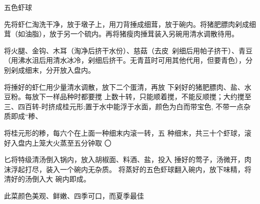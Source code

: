 \begin{recipe}{五色虾球}

\ingredients



\cooking

\step 先将虾仁淘洗干净，放于墩子上，用刀背捶成细茸，放于碗内。将猪肥膘肉剁成细茸（如油脂），放于另一个硫内。再将猪瘦肉捶茸装入另碗用清水调散待用。

\step 将火腿、金钩、木耳（淘净后挤干水份）、慈菇（去皮~剁细后用帕子挤干）、青豆（用沸水沮后用清水冰冷，剁细后挤干。无青苴时可用其他代用，但要青色），分别剁成细末，分开放入盘内。

将捶好的虾仁用少量清水调散，放下二个蛋清，再放 下剁好的猪肥膘肉、盐、水豆粉。每放下一样品种时都要搅 上数十转，只能顺着搅，不能反顺搅；大约搅至三、四百转-时挤成桂元形;置于水中能浮于水面，颜色为白而带宝色, 不带一点杂质即成“糁、

将桂元形的糁，每六个在上面一种细末内滚一转，五 种细末，共三十个虾球，滚好入盘内上笼大火蒸至五分钟取 〇

匕将特级清汤倒入锅内，放入胡椒面、料酒、盐，投入 捶好的莺子，汤微开，肉沫浮起打尽，装入一个碗内无杂质。 将蒸好的五色虾球翻入碗内，放下味精，将清好的汤倒入大 碗内即成。

\notes

此菜颜色美观、鲜嫩、四季可口，而夏季最佳

\end{recipe}

